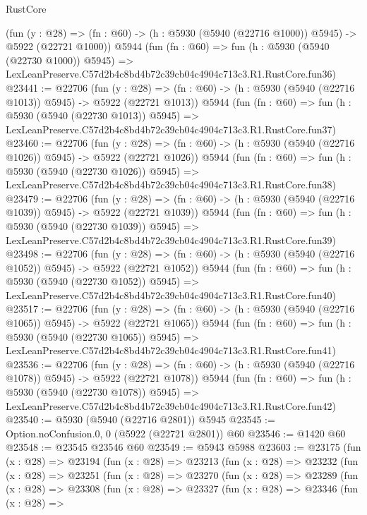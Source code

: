 \begin{lexlean}{RustCore}
\begin{coremodule}
    (fun (y : @28) =>
    (fn : @60) -> (h : @5930 (@5940 (@22716 @1000)) @5945) -> @5922 (@22721 @1000))
    @5944
    (fun (fn : @60) =>
    fun (h : @5930 (@5940 (@22730 @1000)) @5945) =>
    LexLeanPreserve.C57d2b4c8bd4b72c39cb04c4904c713c3.R1.RustCore.fun36)
@23441 := @22706
    (fun (y : @28) =>
    (fn : @60) -> (h : @5930 (@5940 (@22716 @1013)) @5945) -> @5922 (@22721 @1013))
    @5944
    (fun (fn : @60) =>
    fun (h : @5930 (@5940 (@22730 @1013)) @5945) =>
    LexLeanPreserve.C57d2b4c8bd4b72c39cb04c4904c713c3.R1.RustCore.fun37)
@23460 := @22706
    (fun (y : @28) =>
    (fn : @60) -> (h : @5930 (@5940 (@22716 @1026)) @5945) -> @5922 (@22721 @1026))
    @5944
    (fun (fn : @60) =>
    fun (h : @5930 (@5940 (@22730 @1026)) @5945) =>
    LexLeanPreserve.C57d2b4c8bd4b72c39cb04c4904c713c3.R1.RustCore.fun38)
@23479 := @22706
    (fun (y : @28) =>
    (fn : @60) -> (h : @5930 (@5940 (@22716 @1039)) @5945) -> @5922 (@22721 @1039))
    @5944
    (fun (fn : @60) =>
    fun (h : @5930 (@5940 (@22730 @1039)) @5945) =>
    LexLeanPreserve.C57d2b4c8bd4b72c39cb04c4904c713c3.R1.RustCore.fun39)
@23498 := @22706
    (fun (y : @28) =>
    (fn : @60) -> (h : @5930 (@5940 (@22716 @1052)) @5945) -> @5922 (@22721 @1052))
    @5944
    (fun (fn : @60) =>
    fun (h : @5930 (@5940 (@22730 @1052)) @5945) =>
    LexLeanPreserve.C57d2b4c8bd4b72c39cb04c4904c713c3.R1.RustCore.fun40)
@23517 := @22706
    (fun (y : @28) =>
    (fn : @60) -> (h : @5930 (@5940 (@22716 @1065)) @5945) -> @5922 (@22721 @1065))
    @5944
    (fun (fn : @60) =>
    fun (h : @5930 (@5940 (@22730 @1065)) @5945) =>
    LexLeanPreserve.C57d2b4c8bd4b72c39cb04c4904c713c3.R1.RustCore.fun41)
@23536 := @22706
    (fun (y : @28) =>
    (fn : @60) -> (h : @5930 (@5940 (@22716 @1078)) @5945) -> @5922 (@22721 @1078))
    @5944
    (fun (fn : @60) =>
    fun (h : @5930 (@5940 (@22730 @1078)) @5945) =>
    LexLeanPreserve.C57d2b4c8bd4b72c39cb04c4904c713c3.R1.RustCore.fun42)
@23540 := @5930 (@5940 (@22716 @2801)) @5945
@23545 := Option.noConfusion.{0, 0} (@5922 (@22721 @2801)) @60
@23546 := @1420 @60
@23548 := @23545 @23546 @60
@23549 := @5943 @5988
@23603 := @23175
    (fun (x : @28) =>
    @23194
      (fun (x : @28) =>
      @23213
        (fun (x : @28) =>
        @23232
          (fun (x : @28) =>
          @23251
            (fun (x : @28) =>
            @23270
              (fun (x : @28) =>
              @23289
                (fun (x : @28) =>
                @23308
                  (fun (x : @28) =>
                  @23327
                    (fun (x : @28) =>
                    @23346
                      (fun (x : @28) =>

\end{coremodule}
\end{lexlean}
